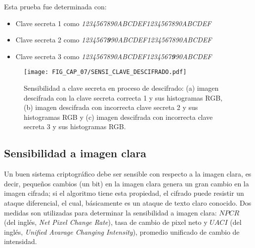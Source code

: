 Esta prueba fue determinada con:
\begin{itemize}
\item Clave secreta 1 como \emph{1234567890ABCDEF1234567890ABCDEF}
\item Clave secreta 2 como \emph{1234567\textbf{9}90ABCDEF1234567890ABCDEF}
\item Clave secreta 3 como \emph{1234567890ABCDEF1234567\textbf{9}90ABCDEF} \\
\end{itemize}

\begin{table}[!htbp] %
	\center
	\caption{Sensibilidad a clave secreta en proceso de cifrado de imagen RGB.}
\end{table}  

\begin{figure}[!htbp] %
	\center
	\texttt{[image: FIG\_CAP\_07/SENSI\_CLAVE\_DESCIFRADO.pdf]}   	 
	\caption{Sensibilidad a clave secreta en proceso de descifrado: (a) imagen descifrada con la clave secreta correcta 1 y sus histogramas RGB, (b) imagen descifrada con incorrecta clave secreta 2 y sus histogramas RGB y (c) imagen descifrada con incorrecta clave secreta 3 y sus histogramas RGB.}
\end{figure}

\subsection{Sensibilidad a imagen clara}
Un buen sistema criptográfico debe ser sensible con respecto a la imagen clara, es decir, pequeños cambios (un  bit) en la imagen clara genera un gran cambio en la imagen cifrada; si el algoritmo tiene esta propiedad, el cifrado puede resistir un ataque diferencial, el cual, básicamente es un ataque de texto claro conocido. Dos medidas son utilizadas para determinar la sensibilidad a imagen clara: $NPCR$ (del inglés, \textit{Net Pixel Change Rate}), tasa de cambio de pixel neto y $UACI$ (del inglés, \textit{Unified Avarage Changing Intensity}), promedio unificado de cambio de intensidad.  \\

